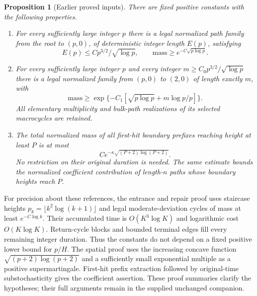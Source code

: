 \documentclass[11pt,letterpaper]{article}
\newtheorem{proposition}[theorem]{Proposition}
\theoremstyle{remark}\newtheorem{remark}[theorem]{Remark}
\numberwithin{equation}{section}
\begin{document}
\begin{proposition}[Earlier proved inputs]\label{ivd:ll:prop:inputs}
There are fixed positive constants with the following properties.
\begin{enumerate}
\item For every sufficiently large integer $p$ there is a legal
normalized path family from the root to $(p,0)$, of deterministic
integer length $E(p)$, satisfying
\begin{equation}\label{ivd:ll:eq:entrance-input}
 E(p)\le C p^{3/2}/\sqrt{\log p},\qquad
 \text{mass}\ge e^{-C\sqrt{p\log p}}.
\end{equation}
\item For every sufficiently large integer $p$ and every integer
$m\ge C_0p^{3/2}/\sqrt{\log p}$ there is a legal normalized family
from $(p,0)$ to $(2,0)$ of length exactly $m$, with
\begin{equation}\label{ivd:ll:eq:repair-input}
 \text{mass}\ge
 \exp\{-C_1[\sqrt{p\log p}+m\log p/p]\}.
\end{equation}
All elementary multiplicity and bulk-path realizations of its selected
macrocycles are retained.
\item The total normalized mass of all first-hit boundary prefixes
reaching height at least $P$ is at most
\begin{equation}\label{ivd:ll:eq:barrier-input}
 C e^{-\kappa\sqrt{(P+2)\log(P+2)}}.
\end{equation}
No restriction on their original duration is needed. The same estimate
bounds the normalized coefficient contribution of length-$n$ paths
whose boundary heights reach $P$.
\end{enumerate}
\end{proposition}
For precision about these references, the entrance and repair proof
uses staircase heights $p_k=\lfloor k^2\log(k+1)\rfloor$ and legal
moderate-deviation cycles of mass at least $e^{-C\log k}$.
Their accumulated time is $O(K^3\log K)$ and logarithmic cost
$O(K\log K)$. Return-cycle blocks and bounded terminal edges fill
every remaining integer duration. Thus the constants do not depend
on a fixed positive lower bound for $p/H$.
The spatial proof uses the increasing concave function
$\sqrt{(p+2)\log(p+2)}$ and a sufficiently small exponential multiple
as a positive supermartingale. First-hit prefix extraction followed
by original-time substochasticity gives the coefficient assertion.
These proof summaries clarify the hypotheses; their full arguments
remain in the supplied unchanged companion.
\end{document}
